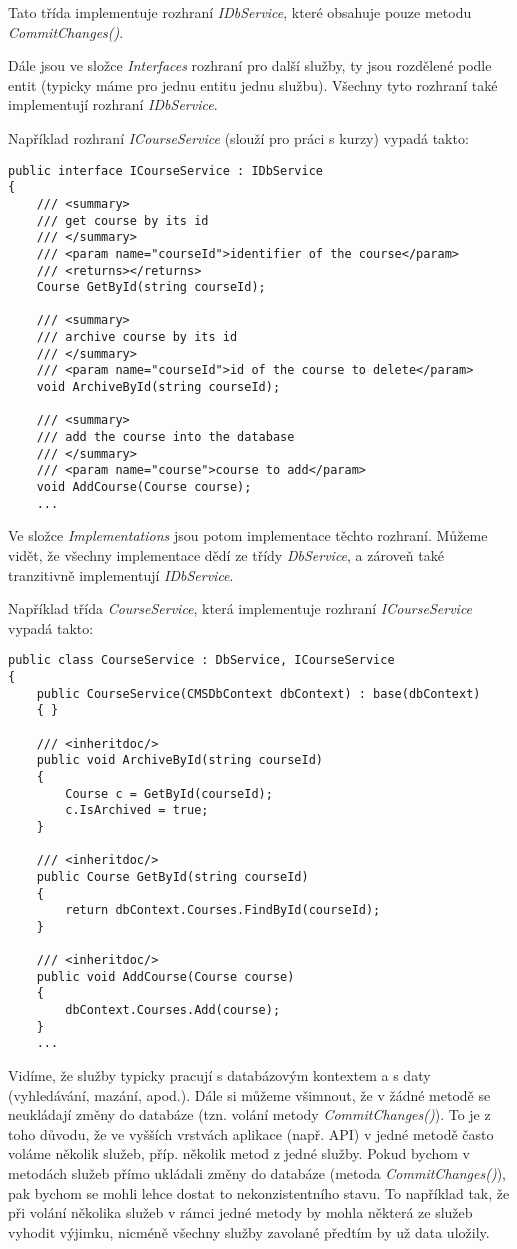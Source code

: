 Tato třída implementuje rozhraní \textit{IDbService}, které obsahuje pouze metodu \textit{CommitChanges()}.

Dále jsou ve složce \textit{Interfaces} rozhraní pro další služby, ty jsou rozdělené podle entit (typicky máme pro jednu entitu jednu službu). Všechny tyto rozhraní také implementují rozhraní \textit{IDbService}. 

Například rozhraní \textit{ICourseService} (slouží pro práci s kurzy) vypadá takto:
\begin{lstlisting}
public interface ICourseService : IDbService
{
	/// <summary>
	/// get course by its id
	/// </summary>
	/// <param name="courseId">identifier of the course</param>
	/// <returns></returns>
	Course GetById(string courseId);
	
	/// <summary>
	/// archive course by its id
	/// </summary>
	/// <param name="courseId">id of the course to delete</param>
	void ArchiveById(string courseId);
	
	/// <summary>
	/// add the course into the database
	/// </summary>
	/// <param name="course">course to add</param>
	void AddCourse(Course course);
	...
\end{lstlisting}

Ve složce \textit{Implementations} jsou potom implementace těchto rozhraní. Můžeme vidět, že všechny implementace dědí ze třídy \textit{DbService}, a zároveň také tranzitivně implementují \textit{IDbService}.

Například třída \textit{CourseService}, která implementuje rozhraní \textit{ICourseService} vypadá takto:

\begin{lstlisting}
public class CourseService : DbService, ICourseService
{
	public CourseService(CMSDbContext dbContext) : base(dbContext)
	{ }
	
	/// <inheritdoc/>
	public void ArchiveById(string courseId)
	{
		Course c = GetById(courseId);
		c.IsArchived = true;
	}
	
	/// <inheritdoc/>
	public Course GetById(string courseId)
	{
		return dbContext.Courses.FindById(courseId);
	}
	
	/// <inheritdoc/>
	public void AddCourse(Course course)
	{
		dbContext.Courses.Add(course);
	}
	...
\end{lstlisting}

Vidíme, že služby typicky pracují s databázovým kontextem a s daty (vyhledávání, mazání, apod.).
Dále si můžeme všimnout, že v žádné metodě se neukládají změny do databáze (tzn. volání metody \textit{CommitChanges()}). To je z toho důvodu, že ve vyšších vrstvách aplikace (např. API) v jedné metodě často voláme několik služeb, příp. několik metod z jedné služby. 
Pokud bychom v metodách služeb přímo ukládali změny do databáze (metoda \textit{CommitChanges()}), pak bychom se mohli lehce dostat to nekonzistentního stavu. To například tak, že při volání několika služeb v rámci jedné metody by 
mohla některá ze služeb vyhodit výjimku, nicméně všechny služby zavolané předtím by už data uložily.

